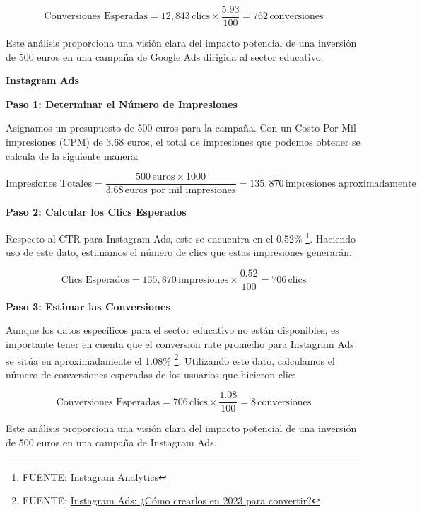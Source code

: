 \documentclass[
]{article}
\begin{document}
\[
\text{Conversiones Esperadas} = 12,843 \, \text{clics} \times \frac{5.93}{100} = 762 \, \text{conversiones}
\]

Este análisis proporciona una visión clara del impacto potencial de una
inversión de 500 euros en una campaña de Google Ads dirigida al sector
educativo.

\newpage

\textbf{Instagram Ads}

\textbf{Paso 1: Determinar el Número de Impresiones}

Asignamos un presupuesto de 500 euros para la campaña. Con un Costo Por
Mil impresiones (CPM) de 3.68 euros, el total de impresiones que podemos
obtener se calcula de la siguiente manera:

\[
\text{Impresiones Totales} = \frac{500 \, \text{euros} \times 1000}{3.68 \, \text{euros por mil impresiones}} = 135,870 \, \text{impresiones aproximadamente}
\]

\textbf{Paso 2: Calcular los Clics Esperados}

Respecto al CTR para Instagram Ads, este se encuentra en el 0.52\%
\footnote{FUENTE:
  \href{https://lorenzo-gonzalez.com/instagram-analytics-las-9-metricas-mas-importantes-para-medir-tu-exito/\#:~:text=Tasas\%20de\%20clics\%20de\%20anuncios\%20(CTR),-El\%20objetivo\%20principal&text=Las\%20tasas\%20de\%20clics\%20promedio,\%2C52\%25\%2Cseg\%C3\%BAn\%20Adstage.}{Instagram
  Analytics}}. Haciendo uso de este dato, estimamos el número de clics
que estas impresiones generarán:

\[
\text{Clics Esperados} = 135,870 \, \text{impresiones} \times \frac{0.52}{100} = 706 \, \text{clics}
\]

\textbf{Paso 3: Estimar las Conversiones}

Aunque los datos específicos para el sector educativo no están
disponibles, es importante tener en cuenta que el conversion rate
promedio para Instagram Ads se sitúa en aproximadamente el 1.08\%
\footnote{FUENTE:
  \href{https://visme.co/blog/es/instagram-ads/}{Instagram Ads: ¿Cómo
  crearlos en 2023 para convertir?}}. Utilizando este dato, calculamos
el número de conversiones esperadas de los usuarios que hicieron clic:

\[
\text{Conversiones Esperadas} = 706 \, \text{clics} \times \frac{1.08}{100} = 8 \, \text{conversiones}
\]

Este análisis proporciona una visión clara del impacto potencial de una
inversión de 500 euros en una campaña de Instagram Ads.
\end{document}
